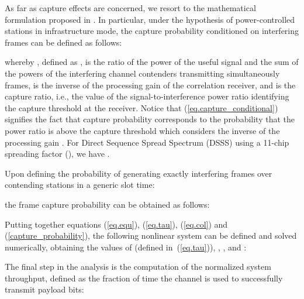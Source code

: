 \documentclass[10pt,onecolumn,a4paper]{IEEEtran}
\begin{document}
As far as capture effects are concerned, we resort to the
mathematical formulation proposed in \cite{zorzi_rao,Spasenovski}.
In particular, under the hypothesis of power-controlled stations
in infrastructure mode, the capture probability conditioned on 
interfering frames can be defined as follows:

whereby , defined as , is the ratio
of the power  of the useful signal and the sum of the
powers of the  interfering channel contenders transmitting
simultaneously  frames,  is the inverse of the processing gain of the
correlation receiver, and  is the capture ratio, i.e., the
value of the signal-to-interference power ratio identifying the
capture threshold at the receiver. Notice that
(\ref{eq.capture_conditional}) signifies the fact that capture
probability corresponds to the probability that the power ratio
 is above the capture threshold  which
considers the inverse of the processing gain . For Direct Sequence
Spread Spectrum (DSSS) using a 11-chip spreading factor
(), we have .

Upon defining the probability of generating exactly 
interfering frames over  contending stations in a generic slot
time:

the frame capture probability  can be obtained as follows:

Putting together equations (\ref{eq.equ}), (\ref{eq.tau}),
(\ref{eq.col}) and (\ref{capture_probability}), the following
nonlinear system can be defined and solved numerically, obtaining
the values of  (defined in~(\ref{eq.tau})), ,
, and :

The final step in the analysis is the computation of the
normalized system throughput, defined as the fraction of time the
channel is used to successfully transmit payload bits:
\end{document}
